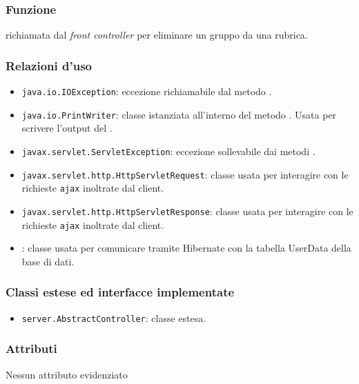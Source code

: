 

\subsubsection*{Funzione}
 richiamata dal \textit{front controller} per eliminare un gruppo da una rubrica.

\subsubsection*{Relazioni d'uso}

\begin{itemize}
\item \texttt{java.io.IOException}: eccezione richiamabile dal metodo .
	\item \texttt{java.io.PrintWriter}: classe istanziata all'interno del metodo . Usata per scrivere l'output del .
	\item \texttt{javax.servlet.ServletException}: eccezione sollevabile dai metodi .
	\item \texttt{javax.servlet.http.HttpServletRequest}: classe usata per interagire con le richieste \texttt{ajax} inoltrate dal client.
	\item \texttt{javax.servlet.http.HttpServletResponse}: classe usata per interagire con le richieste \texttt{ajax} inoltrate dal client.
	\item {}: classe usata per comunicare tramite Hibernate con la tabella UserData della base di dati.
\end{itemize}

\subsubsection*{Classi estese ed interfacce implementate}
\begin{itemize}
	\item \texttt{server.AbstractController}: classe estesa.
\end{itemize}

\subsubsection*{Attributi}

Nessun attributo evidenziato

